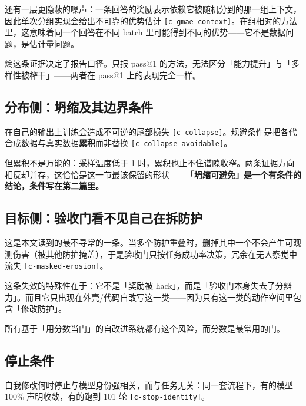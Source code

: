 还有一层更隐蔽的噪声：一条回答的奖励表示依赖它被随机分到的那一组上下文，因此单次分组实现会给出不可靠的优势估计 {\scriptsize\texttt{[c-\hspace{0pt}gmae-\hspace{0pt}context]}}。在组相对的方法里，这意味着同一个回答在不同 batch 里可能得到不同的优势——它不是数据问题，是估计量问题。


熵这条证据决定了报告口径。只报 pass@1 的方法，无法区分「能力提升」与「多样性被榨干」——两者在 pass@1 上的表现完全一样。


\subsection{分布侧：坍缩及其边界条件}

在自己的输出上训练会造成不可逆的尾部损失 {\scriptsize\texttt{[c-\hspace{0pt}collapse]}}。规避条件是把各代合成数据与真实数据\textbf{累积}而非替换 {\scriptsize\texttt{[c-\hspace{0pt}collapse-\hspace{0pt}avoidable]}}。


但累积不是万能的：采样温度低于 1 时，累积也止不住谱隙收窄。两条证据方向相反却并存，这恰恰是这一节最该保留的形状——\textbf{「坍缩可避免」是一个有条件的结论，条件写在第二篇里。}


\subsection{目标侧：验收门看不见自己在拆防护}

这是本文读到的最不寻常的一条。当多个防护重叠时，删掉其中一个不会产生可观测伤害（被其他防护掩盖），于是验收门只按任务成功率决策，冗余在无人察觉中流失 {\scriptsize\texttt{[c-\hspace{0pt}masked-\hspace{0pt}erosion]}}。


这条失效的特殊性在于：它不是「奖励被 hack」，而是「验收门本身失去了分辨力」。而且它只出现在外壳/代码自改写这一类——因为只有这一类的动作空间里包含「修改防护」。


所有基于「用分数当门」的自改进系统都有这个风险，而分数是最常用的门。


\subsection{停止条件}

自我修改何时停止与模型身份强相关，而与任务无关：同一套流程下，有的模型 100\% 声明收敛，有的跑到 101 轮 {\scriptsize\texttt{[c-\hspace{0pt}stop-\hspace{0pt}identity]}}。


